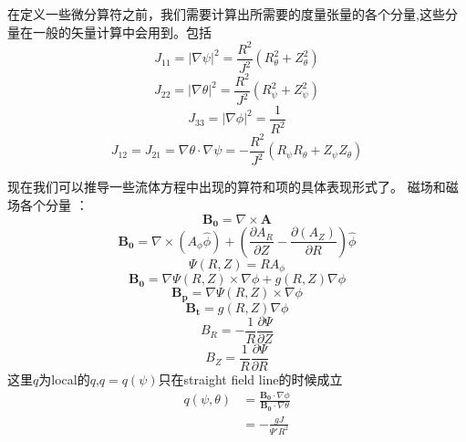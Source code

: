 \documentclass[11pt,a4paper]{article}
\begin{document}
在定义一些微分算符之前，我们需要计算出所需要的度量张量的各个分量,这些分量在一般的矢量计算中会用到。包括 
$$J_{11} = |\nabla\psi|^2 = \frac{R^2}{J^2}(R_\theta^2 + Z_\theta^2)$$ 
$$J_{22} = |\nabla\theta|^2 = \frac{R^2}{J^2}(R_\psi^2 + Z_\psi^2)$$ $$J_{33} = |\nabla\phi|^2 = \frac{1}{R^2} $$ 
$$J_{12} = J_{21} = \nabla\theta\cdot\nabla\psi = -\frac{R^2}{J^2}(R_\psi R_\theta + Z_\psi Z_\theta) $$

现在我们可以推导一些流体方程中出现的算符和项的具体表现形式了。
磁场和磁场各个分量 ：
$$ \pmb{B_0} = \nabla\times\pmb{A} $$ 
$$ \pmb{B_0} = \nabla\times(A_\phi\hat\phi) + (\frac{\partial{A_R}} {\partial{Z}}-\frac{\partial(A_Z)}{\partial{R}})\hat\phi $$ 
$$ \Psi(R,Z) = RA_\phi $$ 
$$ \pmb{B_0} = \nabla\Psi(R,Z)\times\nabla\phi+g(R,Z)\nabla\phi $$ $$ \pmb{B_p} = \nabla\Psi(R,Z)\times\nabla\phi $$ 
$$ \pmb{B_t} = g(R,Z)\nabla\phi $$ 
$$ B_R = -\frac{1}{R}\frac{\partial\Psi}{\partial{Z}} $$ 
$$ B_Z = \frac{1}{R}\frac{\partial\Psi}{\partial{R}} $$
这里$q$为local的$q$,$q = q(\psi)$只在straight field line的时候成立 
$$ 
\begin{aligned} 
q(\psi,\theta) &=\frac{\pmb{B_0}\cdot\nabla\phi}{\pmb{B_0}\cdot\nabla\theta} \\ 
&= -\frac{gJ}{\Psi'R^2} 
\end{aligned} 
$$
\end{document}
